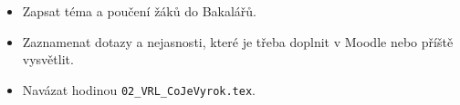 \documentclass[11pt,a4paper]{article}
\begin{document}

\begin{itemize}[label=$\square$]
  \item Zapsat téma a poučení žáků do Bakalářů.
  \item Zaznamenat dotazy a nejasnosti, které je třeba doplnit v Moodle nebo příště vysvětlit.
  \item Navázat hodinou \texttt{02\_VRL\_CoJeVyrok.tex}.
\end{itemize}
\end{document}
